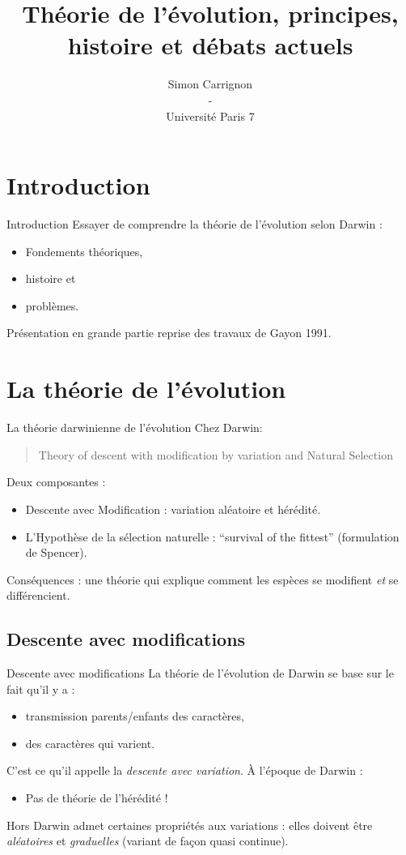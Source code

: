 \documentclass[8pt]{beamer}
\author{Simon Carrignon\\-\\Université Paris 7}
\title{Théorie de l'évolution, principes, histoire et débats actuels}
\begin{document}
\begin{frame}
	\titlepage
\end{frame}
\section{Introduction}
\begin{frame}{Introduction}
	Essayer de comprendre la théorie de l'évolution selon Darwin :
	\vfill
	\begin{itemize}
		\item Fondements théoriques,
		\item histoire et
		\item problèmes.
	\end{itemize}
	\vfill
	Présentation en grande partie reprise des travaux de Gayon 1991.
\end{frame}

\section{La théorie de l'évolution}
\begin{frame}{La théorie darwinienne de l'évolution}
	Chez Darwin:
	\begin{quote}
		Theory of descent with modification by variation and Natural Selection
	\end{quote}

	\vfill

	Deux composantes :
	\begin{itemize}
		\item Descente avec Modification : variation aléatoire et hérédité.
		\item L'Hypothèse de la sélection naturelle : ``survival of the fittest'' (formulation de Spencer).
	\end{itemize}
	\vfil
	Conséquences : une théorie qui explique comment les espèces se modifient \emph{et} se différencient.
\end{frame}

\subsection{Descente avec modifications}
\begin{frame}{Descente avec modifications}
La théorie de l'évolution de Darwin se base sur le fait qu'il y a :
	\begin{itemize}
		\item transmission parents/enfants des caractères, 
		\item des caractères qui varient.
	\end{itemize}
	\vfil
	C'est ce qu'il appelle la \emph{descente avec variation}.
	\vfill 
	\`A l'époque de Darwin : 

\vfil
	\begin{itemize}
		\item Pas de théorie de l'hérédité !
	\end{itemize}
	Hors Darwin admet certaines propriétés aux variations : elles doivent être \emph{aléatoires} et \emph{graduelles} (variant de façon quasi continue). 

\end{frame}
\end{document}
